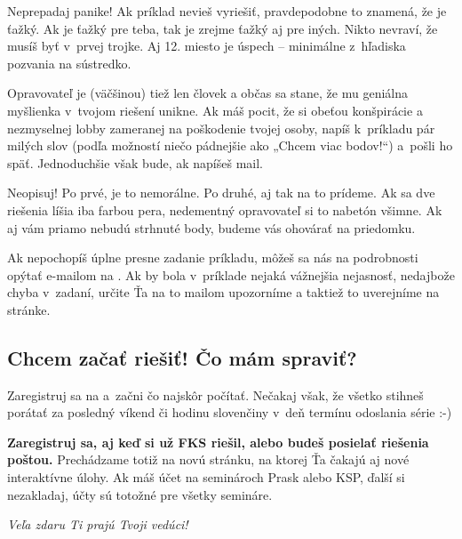     Neprepadaj panike! Ak príklad nevieš vyriešiť, pravdepodobne to znamená, že je
    ťažký. Ak je ťažký pre teba, tak je zrejme ťažký aj pre iných. Nikto nevraví,
    že musíš byť v~prvej trojke. Aj 12. miesto je úspech -- minimálne z~hľadiska
    pozvania na sústredko.

    Opravovateľ je (väčšinou) tiež len človek a občas sa stane, že mu geniálna
    myšlienka v~tvojom riešení unikne. Ak máš pocit, že si obeťou konšpirácie a
    nezmyselnej lobby zameranej na poškodenie tvojej osoby, napíš k~príkladu pár
    milých slov (podľa možností niečo pádnejšie ako „Chcem viac bodov!“) a~pošli
    ho späť. Jednoduchšie však bude, ak napíšeš mail.

    Neopisuj! Po prvé, je to nemorálne. Po druhé, aj tak na to prídeme. Ak sa dve riešenia
    líšia iba farbou pera, nedementný opravovateľ si to nabetón všimne. Ak aj vám
    priamo nebudú strhnuté body, budeme vás ohovárať na priedomku.

    Ak nepochopíš úplne presne zadanie príkladu, môžeš sa nás na podrobnosti opýtať
    e-mailom na {\URL{\seminarEmail}}. Ak by bola v~príklade nejaká vážnejšia
    nejasnosť, nedajbože chyba v~zadaní, určite Ťa na to mailom upozorníme a taktiež to uverejníme na stránke.

\subsection{Chcem začať riešiť! Čo mám spraviť?}
    Zaregistruj sa na \URL{\seminarURL} a~začni čo najskôr počítať. Nečakaj však, že všetko stihneš porátať
    za posledný víkend či hodinu slovenčiny v~deň termínu odoslania série :-)

\textbf{Zaregistruj sa, aj keď si už FKS riešil, alebo budeš posielať riešenia poštou.}
Prechádzame totiž na novú stránku, na ktorej Ťa čakajú aj nové interaktívne úlohy. Ak máš účet na seminároch Prask alebo KSP, ďalší si nezakladaj, účty sú totožné pre všetky semináre.

\hfill \emph{Veľa zdaru Ti prajú Tvoji vedúci!}%
